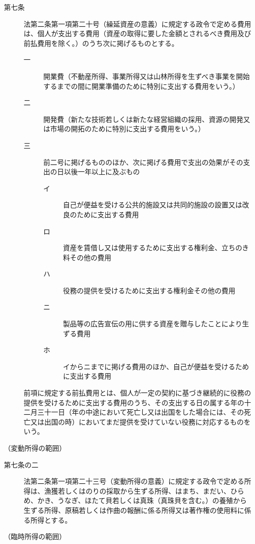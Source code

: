 \documentclass[twocolumn,a4j,10pt]{ltjtarticle}
\begin{document}
\begin{description}
\item[第七条]法第二条第一項第二十号（繰延資産の意義）に規定する政令で定める費用は、個人が支出する費用（資産の取得に要した金額とされるべき費用及び前払費用を除く。）のうち次に掲げるものとする。
\begin{description}
\item[一]開業費（不動産所得、事業所得又は山林所得を生ずべき事業を開始するまでの間に開業準備のために特別に支出する費用をいう。）
\item[二]開発費（新たな技術若しくは新たな経営組織の採用、資源の開発又は市場の開拓のために特別に支出する費用をいう。）
\item[三]前二号に掲げるもののほか、次に掲げる費用で支出の効果がその支出の日以後一年以上に及ぶもの
\begin{description}
\item[イ]自己が便益を受ける公共的施設又は共同的施設の設置又は改良のために支出する費用
\item[ロ]資産を賃借し又は使用するために支出する権利金、立ちのき料その他の費用
\item[ハ]役務の提供を受けるために支出する権利金その他の費用
\item[ニ]製品等の広告宣伝の用に供する資産を贈与したことにより生ずる費用
\item[ホ]イからニまでに掲げる費用のほか、自己が便益を受けるために支出する費用
\end{description}
\end{description}
\item[]前項に規定する前払費用とは、個人が一定の契約に基づき継続的に役務の提供を受けるために支出する費用のうち、その支出する日の属する年の十二月三十一日（年の中途において死亡し又は出国をした場合には、その死亡又は出国の時）においてまだ提供を受けていない役務に対応するものをいう。
\end{description}
\noindent\hspace{10pt}（変動所得の範囲）
\begin{description}
\item[第七条の二]法第二条第一項第二十三号（変動所得の意義）に規定する政令で定める所得は、漁獲若しくはのりの採取から生ずる所得、はまち、まだい、ひらめ、かき、うなぎ、ほたて貝若しくは真珠（真珠貝を含む。）の養殖から生ずる所得、原稿若しくは作曲の報酬に係る所得又は著作権の使用料に係る所得とする。
\end{description}
\noindent\hspace{10pt}（臨時所得の範囲）
\end{document}
